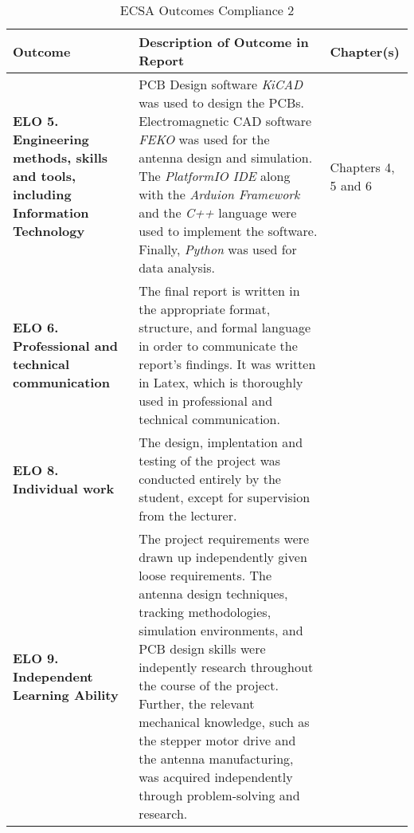 \begin{table}[!htb]
  \centering
  \renewcommand{\arraystretch}{1.2}
  \begin{tabular}{ |p{4cm}|p{8cm}|p{3cm}| }
  \hline
  \textbf{Outcome}        & \textbf{Description of Outcome in Report}     & \textbf{Chapter(s)} \\
  \hline
  \textbf{ELO 5. Engineering methods, skills and tools, including Information Technology} &
  PCB Design software \textit{KiCAD} was used to design the PCBs. Electromagnetic CAD software \textit{FEKO} was used for the antenna design and simulation. The \textit{PlatformIO IDE} along with the \textit{Arduion Framework} and the \textit{C++} language were used to implement the software. Finally, \textit{Python} was used for data analysis. &
  Chapters 4, 5 and 6 \\ \hline
  \textbf{ELO 6. Professional and technical communication} &
  The final report is written in the appropriate format, structure, and formal language in order to communicate the report's findings. It was written in Latex, which is thoroughly used in professional and technical communication. &
   \\ \hline
  \textbf{ELO 8. Individual work} &
  The design, implentation and testing of the project was conducted entirely by the student, except for supervision from the lecturer. &
   \\ \hline
  \textbf{ELO 9. Independent Learning Ability} &
  The project requirements were drawn up independently given loose requirements. The antenna design techniques, tracking methodologies, simulation environments, and PCB design skills were indepently research throughout the course of the project. Further, the relevant mechanical knowledge, such as the stepper motor drive and the antenna manufacturing, was acquired independently through problem-solving and research. &
   \\ \hline
  \end{tabular}
  \caption{ECSA Outcomes Compliance 2}
  \label{tab:outcomesCompliance2}
\end{table}
\clearpage